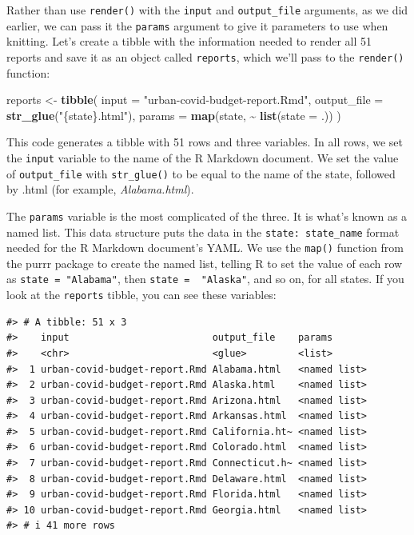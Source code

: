 \documentclass[
]{book}
\newenvironment{Shaded}{\begin{snugshade}}{\end{snugshade}}
\newcommand{\AttributeTok}[1]{\textcolor[rgb]{0.13,0.29,0.53}{#1}}
\newcommand{\FunctionTok}[1]{\textcolor[rgb]{0.13,0.29,0.53}{\textbf{#1}}}
\newcommand{\NormalTok}[1]{#1}
\newcommand{\OtherTok}[1]{\textcolor[rgb]{0.56,0.35,0.01}{#1}}
\newcommand{\SpecialCharTok}[1]{\textcolor[rgb]{0.81,0.36,0.00}{\textbf{#1}}}
\newcommand{\StringTok}[1]{\textcolor[rgb]{0.31,0.60,0.02}{#1}}
\begin{document}
Rather than use \texttt{render()} with the \texttt{input} and \texttt{output\_file} arguments, as we did earlier, we can pass it the \texttt{params} argument to give it parameters to use when knitting. Let's create a tibble with the information needed to render all 51 reports and save it as an object called \texttt{reports}, which we'll pass to the \texttt{render()} function:

\begin{Shaded}
\begin{Highlighting}[]
\NormalTok{reports }\OtherTok{\textless{}{-}} \FunctionTok{tibble}\NormalTok{(}
  \AttributeTok{input =} \StringTok{"urban{-}covid{-}budget{-}report.Rmd"}\NormalTok{,}
  \AttributeTok{output\_file =} \FunctionTok{str\_glue}\NormalTok{(}\StringTok{"\{state\}.html"}\NormalTok{),}
  \AttributeTok{params =} \FunctionTok{map}\NormalTok{(state, }\SpecialCharTok{\textasciitilde{}} \FunctionTok{list}\NormalTok{(}\AttributeTok{state =}\NormalTok{ .))}
\NormalTok{)}
\end{Highlighting}
\end{Shaded}

This code generates a tibble with 51 rows and three variables. In all rows, we set the \texttt{input} variable to the name of the R Markdown document. We set the value of \texttt{output\_file} with \texttt{str\_glue()} to be equal to the name of the state, followed by .html (for example, \emph{Alabama.html}).

The \texttt{params} variable is the most complicated of the three. It is what's known as a named list. This data structure puts the data in the \texttt{state:\ state\_name} format needed for the R Markdown document's YAML. We use the \texttt{map()} function from the purrr package to create the named list, telling R to set the value of each row as \texttt{state\ =\ "Alabama"}, then \texttt{state\ =\ \ "Alaska"}, and so on, for all states. If you look at the \texttt{reports} tibble, you can see these variables:

\begin{verbatim}
#> # A tibble: 51 x 3
#>    input                         output_file    params      
#>    <chr>                         <glue>         <list>      
#>  1 urban-covid-budget-report.Rmd Alabama.html   <named list>
#>  2 urban-covid-budget-report.Rmd Alaska.html    <named list>
#>  3 urban-covid-budget-report.Rmd Arizona.html   <named list>
#>  4 urban-covid-budget-report.Rmd Arkansas.html  <named list>
#>  5 urban-covid-budget-report.Rmd California.ht~ <named list>
#>  6 urban-covid-budget-report.Rmd Colorado.html  <named list>
#>  7 urban-covid-budget-report.Rmd Connecticut.h~ <named list>
#>  8 urban-covid-budget-report.Rmd Delaware.html  <named list>
#>  9 urban-covid-budget-report.Rmd Florida.html   <named list>
#> 10 urban-covid-budget-report.Rmd Georgia.html   <named list>
#> # i 41 more rows
\end{verbatim}
\end{document}
